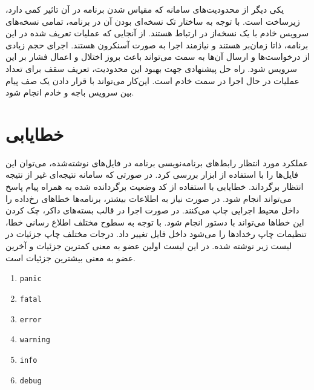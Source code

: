 یکی دیگر از محدودیت‌های سامانه که مقیاس شدن برنامه در آن تاثیر کمی دارد، زیرساخت  است. با توجه به ساختار تک نسخه‌ای بودن آن در برنامه، تمامی نسخه‌های سرویس خادم با یک نسخه‌از  در ارتباط هستند. از آنجایی که عملیات تعریف شده در این برنامه، ذاتا زمان‌بر هستند و نیازمند اجرا به صورت آسنکرون هستند. اجرای حجم زیادی از درخواست‌ها و ارسال آن‌ها به سمت  می‌تواند باعث بروز اختلال و اعمال فشار بر این سرویس شود. راه حل پیشنهادی جهت بهبود این محدودیت، تعریف سقف برای تعداد عملیات در حال اجرا در سمت خادم است. این‌کار می‌تواند با قرار دادن یک صف پیام بین سرویس باجه و خادم انجام شود.

\clearpage
\section{خطایابی}
عملکرد مورد انتظار رابط‌های برنامه‌نویسی برنامه در فایل‌های  نوشته‌شده، می‌توان این فایل‌ها را با استفاده از ابزار  بررسی کرد. در صورتی که سامانه نتیجه‌ای غیر از نتیجه انتظار برگرداند. خطایابی با استفاده از کد وضعیت برگردانده شده به همراه پیام پاسخ می‌تواند انجام شود. در صورت نیاز به اطلاعات بیشتر، برنامه‌ها خطا‌های رخ‌داده را داخل  محیط اجرایی چاپ می‌کنند. در صورت اجرا در قالب بسته‌های داکر، چک کردن این خطا‌ها می‌تواند با دستور  انجام شود. با توجه به سطوح مختلف اطلاع رسانی خطا، تنظیمات چاپ رخداد‌ها را می‌شود داخل فایل  تغییر داد. درجات مختلف چاپ جزئیات در لیست زیر نوشته شده. در این لیست اولین عضو به معنی کمترین جزئیات و آخرین عضو به معنی بیشترین جزئیات است.

\begin{enumerate}
	\item \texttt{panic}
	\item \texttt{fatal}
	\item \texttt{error}
	\item \texttt{warning}
	\item \texttt{info}
	\item \texttt{debug}
\end{enumerate}
